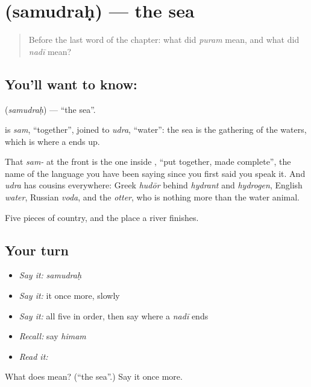 \section[\texorpdfstring{\sk{समुद्रः} (samudraḥ)}{समुद्रः (samudraḥ)}]{ (samudraḥ) — the sea}

\label{lesson:SA-C33-sea}



\begin{quote}
Before the last word of the chapter: what did \emph{puram} mean, and what did \emph{nadī} mean?
\end{quote}

\subsection*{You'll want to know: }
\textbf{} (\emph{samudraḥ}) — \textquotedblleft{}the sea\textquotedblright{}.

\textbf{} is \emph{sam}, \textquotedblleft{}together\textquotedblright{}, joined to \emph{udra}, \textquotedblleft{}water\textquotedblright{}: the sea is the gathering of the waters, which is where a \textbf{} ends up.

That \emph{sam-} at the front is the one inside \textbf{}, \textquotedblleft{}put together, made complete\textquotedblright{}, the name of the language you have been saying since you first said you speak it. And \emph{udra} has cousins everywhere: Greek \emph{hudōr} behind \emph{hydrant} and \emph{hydrogen}, English \emph{water}, Russian \emph{voda}, and the \emph{otter}, who is nothing more than the water animal.

\begin{grammarlens}[title={What you've built}]
Five pieces of country, and the place a river finishes.
\end{grammarlens}

\subsection*{Your turn}
\begin{itemize}
\raggedright
  \item \emph{Say it:} \emph{samudraḥ}
  \item \emph{Say it:} it once more, slowly
  \item \emph{Say it:} all five in order, then say where a \emph{nadī} ends
  \item \emph{Recall:} say \emph{himam}
  \item \emph{Read it:} \textbf{}
\end{itemize}

\begin{tcolorbox}[breakable,colback=teal!4,colframe=teal!35!black,title={Before you move on}]
What does  mean? (\textquotedblleft{}the sea\textquotedblright{}.) Say it once more.
\end{tcolorbox}
